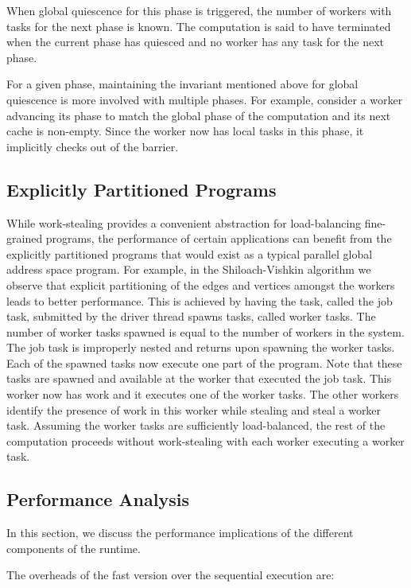 When global quiescence for this phase is triggered, the number of
workers with tasks for the next phase is known. The computation is
said to have terminated when the current phase has quiesced and no
worker has any task for the next phase. 

For a given phase, maintaining the invariant mentioned above for
global quiescence is more involved with multiple phases. For example,
consider a worker advancing its phase to match the global phase of the
computation and its next cache is non-empty. Since the worker now has
local tasks in this phase, it implicitly checks out of the barrier.


\subsection{Explicitly Partitioned Programs}

While work-stealing provides a convenient abstraction for
load-balancing fine-grained programs, the performance of certain
applications can benefit from the explicitly partitioned programs that
would exist as a typical parallel global address space program. For
example, in the Shiloach-Vishkin algorithm we observe that explicit
partitioning of the edges and vertices amongst the workers leads to
better performance. This is achieved by having the task, called the
job task, submitted by the driver thread spawns tasks, called worker
tasks. The number of worker tasks spawned is equal to the number of
workers in the system. The job task is improperly nested and returns
upon spawning the worker tasks. Each of the spawned tasks now execute
one part of the program. Note that these tasks are spawned and
available at the worker that executed the job task. This worker now
has work and it executes one of the worker tasks. The other workers
identify the presence of work in this worker while stealing and steal
a worker task. Assuming the worker tasks are sufficiently
load-balanced, the rest of the computation proceeds without
work-stealing with each worker executing a worker task. 

\subsection{Performance Analysis}

In this section, we discuss the performance implications of the
different components of the runtime. 

The overheads of the fast version over the sequential execution are:

